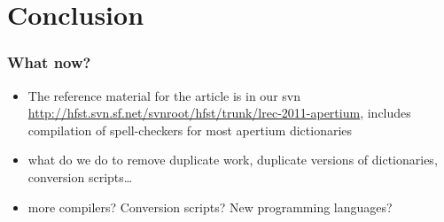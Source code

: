\documentclass{beamer}
\begin{document}
\section{Conclusion}

\begin{frame}
    \frametitle{What now?}
    \begin{itemize}
        \item The reference material for the article is in our svn
            \url{http://hfst.svn.sf.net/svnroot/hfst/trunk/lrec-2011-apertium},
            includes compilation of spell-checkers for most apertium
            dictionaries
        \item what do we do to remove duplicate work, duplicate versions of
            dictionaries, conversion scripts\ldots
        \item more compilers? Conversion scripts? New programming languages?
    \end{itemize}
\end{frame}
\end{document}
